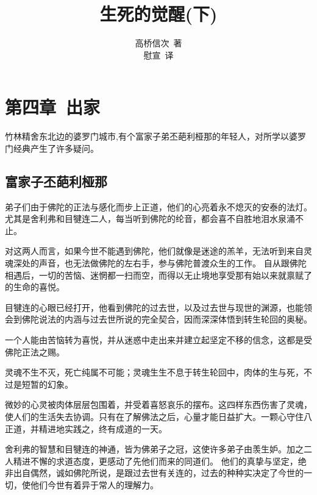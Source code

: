 \documentclass[twoside,openany]{book}
\title{生死的觉醒(下)}
\author{高桥信次\ 著\\ 慰宣\ 译}
\date{}
\begin{document}
\maketitle
\tableofcontents

\noindent


\setcounter{chapter}{3}
\chapter{第四章\ \textperiodcentered {}出家}\label{ch4}

竹林精舍东北边的婆罗门城市,有个富家子弟丕葩利\textperiodcentered 桠那的年轻人，对所学以婆罗门经典产生了许多疑问。

\newpage
\section{富家子丕葩利\textperiodcentered 桠那}\label{sec4.1}

弟子们由于佛陀的正法与感化而步上正道，他们的心亮着永不熄灭的安泰的法灯。
尤其是舍利弗和目犍连二人，每当听到佛陀的纶音，都会喜不自胜地泪水泉涌不止。

对这两人而言，如果今世不能遇到佛陀，他们就像是迷途的羔羊，无法听到来自灵魂深处的声音，也无法做佛陀的左右手，参与佛陀普渡众生的工作。
自从跟佛陀相遇后，一切的苦恼、迷惘都一扫而空，而得以无止境地享受那有始以来就禀赋了的生命的喜悦。

目犍连的心眼已经打开，他看到佛陀的过去世，以及过去世与现世的渊源，也能领会到佛陀说法的内涵与过去世所说的完全契合，因而深深体悟到转生轮回的奥秘。

一个人能由苦恼转为喜悦，并从迷惑中走出来并建立起坚定不移的信念，这都是受佛陀正法之赐。

灵魂不生不灭，死亡纯属不可能；灵魂生生不息于转生轮回中，肉体的生与死，不过是短暂的幻象。

微妙的心灵被肉体层层包围着，并受着喜怒哀乐的摆布。这四样东西伤害了灵魂，使人们的生活失去协调。只有在了解佛法之后，心量才能日益扩大。一颗心守住八正道，并精进地实践之，终有成道的一天。

舍利弗的智慧和目犍连的神通，皆为佛弟子之冠，这使许多弟子由羡生妒。加之二人精进不懈的求道态度，更感动了先他们而来的同道们。
他们的真挚与坚定，绝非出自偶然，诚如佛陀所说，是跟过去世有关连的，过去的种种实决定了今世的一切，使他们今世有着异于常人的理解力。
\end{document}
